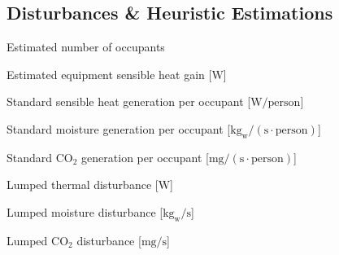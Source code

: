 \documentclass[12pt, a4paper]{article}
\begin{document}
	\subsection*{Disturbances \& Heuristic Estimations}
	\begin{description}[align=left, labelwidth=2.5cm, leftmargin=!]
		\item[$N_{\mathrm{occ}}$] Estimated number of occupants
		\item[$Q_{\mathrm{equip}}$] Estimated equipment sensible heat gain [$\mathrm{W}$]
		\item[$q_{\mathrm{person}}$] Standard sensible heat generation per occupant [$\mathrm{W/person}$]
		\item[$g_{w,\mathrm{person}}$] Standard moisture generation per occupant [$\mathrm{kg_w/(s \cdot person)}$]
		\item[$g_{\mathrm{co2,person}}$] Standard $\mathrm{CO}_2$ generation per occupant [$\mathrm{mg/(s \cdot person)}$]
		\item[$d_T$] Lumped thermal disturbance [$\mathrm{W}$]
		\item[$d_W$] Lumped moisture disturbance [$\mathrm{kg_w/s}$]
		\item[$d_C$] Lumped $\mathrm{CO}_2$ disturbance [$\mathrm{mg/s}$]
	\end{description}
	
	
	
\end{document}
